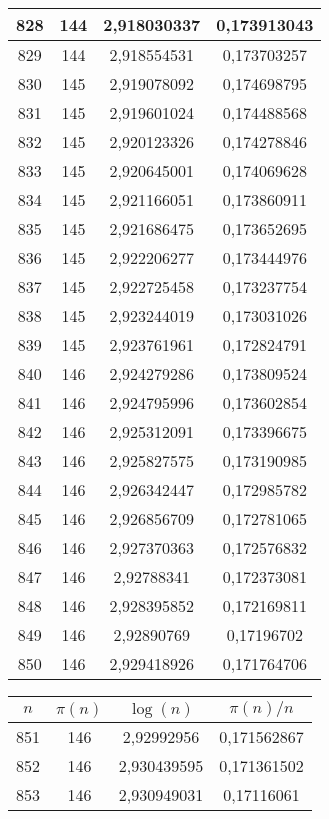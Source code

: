 {\begin{minipage}[!h]{0.45\textwidth}
\begin{longtable}{cccc}
828 & 144 & 2,918030337 & 0,173913043 \\ \hline
829 & 144 & 2,918554531 & 0,173703257 \\ \hline
830 & 145 & 2,919078092 & 0,174698795 \\ \hline
831 & 145 & 2,919601024 & 0,174488568 \\ \hline
832 & 145 & 2,920123326 & 0,174278846 \\ \hline
833 & 145 & 2,920645001 & 0,174069628 \\ \hline
834 & 145 & 2,921166051 & 0,173860911 \\ \hline
835 & 145 & 2,921686475 & 0,173652695 \\ \hline
836 & 145 & 2,922206277 & 0,173444976 \\ \hline
837 & 145 & 2,922725458 & 0,173237754 \\ \hline
838 & 145 & 2,923244019 & 0,173031026 \\ \hline
839 & 145 & 2,923761961 & 0,172824791 \\ \hline
840 & 146 & 2,924279286 & 0,173809524 \\ \hline
841 & 146 & 2,924795996 & 0,173602854 \\ \hline
842 & 146 & 2,925312091 & 0,173396675 \\ \hline
843 & 146 & 2,925827575 & 0,173190985 \\ \hline
844 & 146 & 2,926342447 & 0,172985782 \\ \hline
845 & 146 & 2,926856709 & 0,172781065 \\ \hline
846 & 146 & 2,927370363 & 0,172576832 \\ \hline
847 & 146 & 2,92788341 & 0,172373081 \\ \hline
848 & 146 & 2,928395852 & 0,172169811 \\ \hline
849 & 146 & 2,92890769 & 0,17196702 \\ \hline
850 & 146 & 2,929418926 & 0,171764706 \\ \hline
\end{longtable}
\end{minipage}
\begin{minipage}[!h]{0.45\textwidth}\centering
\tiny
\begin{longtable}{cccc} \hline
\(n\) & \(\pi(n)\) & \(\log(n)\) & \(\pi(n)/n\) \\ \hline
851 & 146 & 2,92992956 & 0,171562867 \\ \hline
852 & 146 & 2,930439595 & 0,171361502 \\ \hline
853 & 146 & 2,930949031 & 0,17116061 \\ \hline

\end{longtable}
\end{minipage}}
